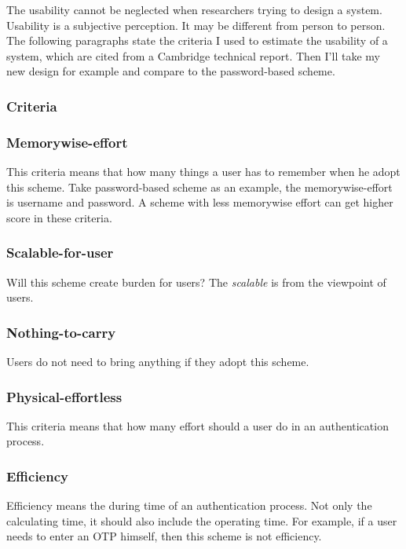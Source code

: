 \begin{CJK}{Bg5}{bsmi}
The usability cannot be neglected when researchers trying to design a system.
Usability is a subjective perception. It may be different from person to person.
The following paragraphs state the criteria I used to estimate the usability of a system, which are cited from a Cambridge technical report\cite{password-extended}. Then I'll take my new design for example and compare to the password-based scheme.

\subsubsection{Criteria}

\subsubsection{Memorywise-effort}

This criteria means that how many things a user has to remember when he adopt this scheme. Take password-based scheme as an example, the memorywise-effort is username and password. A scheme with less memorywise effort can get higher score in these criteria.

\subsubsection{Scalable-for-user}

Will this scheme create burden for users? The \emph{scalable} is from the viewpoint of users.

\subsubsection{Nothing-to-carry}

Users do not need to bring anything if they adopt this scheme.

\subsubsection{Physical-effortless}

This criteria means that how many effort should a user do in an authentication process.

\subsubsection{Efficiency}

Efficiency means the during time of an authentication process. Not only the calculating time, it should also include the operating time. For example, if a user needs to enter an OTP himself, then this scheme is not efficiency.


\end{CJK}
